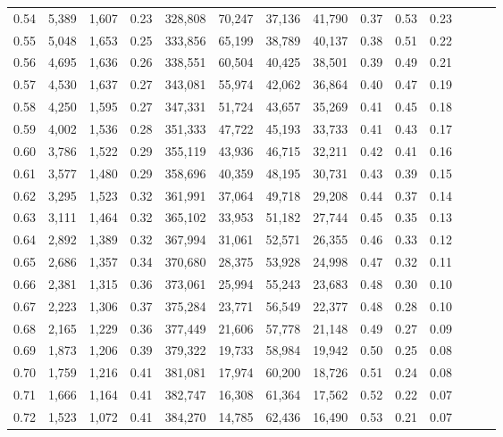 \begin{tabular}{rrrrrrrrrrrrrr}
0.54 &  5,389 &  1,607 &  0.23 &  328,808 &   70,247 &  37,136 &  41,790 &  0.37 &  0.53 &      0.23 \\
0.55 &  5,048 &  1,653 &  0.25 &  333,856 &   65,199 &  38,789 &  40,137 &  0.38 &  0.51 &      0.22 \\
0.56 &  4,695 &  1,636 &  0.26 &  338,551 &   60,504 &  40,425 &  38,501 &  0.39 &  0.49 &      0.21 \\
0.57 &  4,530 &  1,637 &  0.27 &  343,081 &   55,974 &  42,062 &  36,864 &  0.40 &  0.47 &      0.19 \\
0.58 &  4,250 &  1,595 &  0.27 &  347,331 &   51,724 &  43,657 &  35,269 &  0.41 &  0.45 &      0.18 \\
0.59 &  4,002 &  1,536 &  0.28 &  351,333 &   47,722 &  45,193 &  33,733 &  0.41 &  0.43 &      0.17 \\
0.60 &  3,786 &  1,522 &  0.29 &  355,119 &   43,936 &  46,715 &  32,211 &  0.42 &  0.41 &      0.16 \\
0.61 &  3,577 &  1,480 &  0.29 &  358,696 &   40,359 &  48,195 &  30,731 &  0.43 &  0.39 &      0.15 \\
0.62 &  3,295 &  1,523 &  0.32 &  361,991 &   37,064 &  49,718 &  29,208 &  0.44 &  0.37 &      0.14 \\
0.63 &  3,111 &  1,464 &  0.32 &  365,102 &   33,953 &  51,182 &  27,744 &  0.45 &  0.35 &      0.13 \\
0.64 &  2,892 &  1,389 &  0.32 &  367,994 &   31,061 &  52,571 &  26,355 &  0.46 &  0.33 &      0.12 \\
0.65 &  2,686 &  1,357 &  0.34 &  370,680 &   28,375 &  53,928 &  24,998 &  0.47 &  0.32 &      0.11 \\
0.66 &  2,381 &  1,315 &  0.36 &  373,061 &   25,994 &  55,243 &  23,683 &  0.48 &  0.30 &      0.10 \\
0.67 &  2,223 &  1,306 &  0.37 &  375,284 &   23,771 &  56,549 &  22,377 &  0.48 &  0.28 &      0.10 \\
0.68 &  2,165 &  1,229 &  0.36 &  377,449 &   21,606 &  57,778 &  21,148 &  0.49 &  0.27 &      0.09 \\
0.69 &  1,873 &  1,206 &  0.39 &  379,322 &   19,733 &  58,984 &  19,942 &  0.50 &  0.25 &      0.08 \\
0.70 &  1,759 &  1,216 &  0.41 &  381,081 &   17,974 &  60,200 &  18,726 &  0.51 &  0.24 &      0.08 \\
0.71 &  1,666 &  1,164 &  0.41 &  382,747 &   16,308 &  61,364 &  17,562 &  0.52 &  0.22 &      0.07 \\
0.72 &  1,523 &  1,072 &  0.41 &  384,270 &   14,785 &  62,436 &  16,490 &  0.53 &  0.21 &      0.07 \\

\end{tabular}

